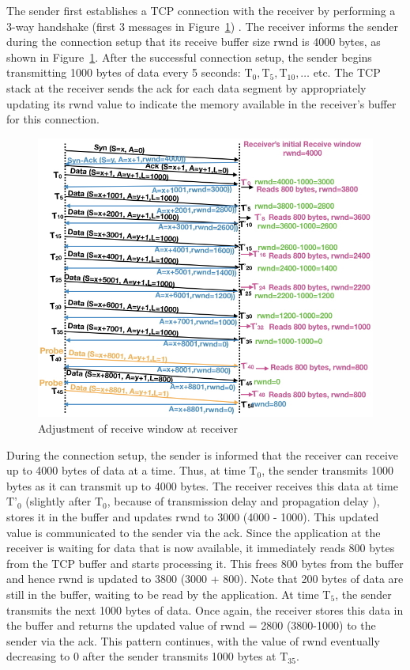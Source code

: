 \begin{multicols}{2}
The sender first establishes a TCP connection with the receiver by performing a 3-way handshake (first 3 messages in Figure~\ref{chap3-fig02}) \cite{art3-key05}. The receiver informs the sender during the connection setup that its receive buffer size rwnd is 4000 bytes, as shown in Figure~\ref{chap3-fig02}. After the successful connection setup, the sender begins transmitting 1000 bytes of data every 5 seconds: ${\text{T}}_0, {\text{T}}_5, {\text{T}}_{10}, … $ etc. The TCP stack at the receiver sends the ack for each data segment by appropriately updating its rwnd value to indicate the memory available in the receiver’s buffer for this connection. 
\begin{figure}[H]
\centering
\includegraphics[scale=1.4]{src/Figures/chap3/chap3-fig02.jpg}
\caption{ Adjustment of receive window at receiver}\label{chap3-fig02}
\end{figure}

During the connection setup, the sender is informed that the receiver can receive up to 4000 bytes of data at a time. Thus, at time ${\text{T}}_0$, the sender transmits 1000 bytes as it can transmit up to 4000 bytes. The receiver receives this data at time ${\text{T’}}_{0}$ (slightly after ${\text{T}}_{0}$, because of transmission delay and propagation delay \cite{art3-key08}), stores it in the buffer and updates rwnd to 3000 (4000 - 1000). This updated value is communicated to the sender via the ack. Since the application at the receiver is waiting for data that is now available, it immediately reads 800 bytes from the TCP buffer and starts processing it. This frees 800 bytes from the buffer and hence rwnd is updated to 3800 (3000 + 800). Note that 200 bytes of data are still in the buffer, waiting to be read by the application. At time ${\text{T}}_5$, the sender transmits the next 1000 bytes of data. Once again, the receiver stores this data in the buffer and returns the updated value of rwnd = 2800 (3800-1000) to the sender via the ack. This pattern continues, with the value of rwnd eventually decreasing to 0 after the sender transmits 1000 bytes at ${\text{T}}_{35}$.


\end{multicols}
